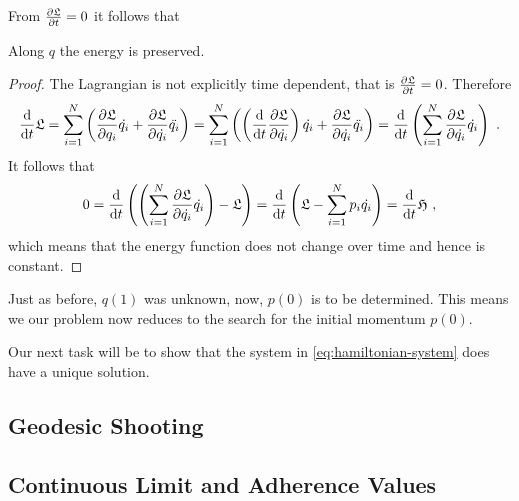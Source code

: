 From $\frac{\partial \mathfrak{L}}{\partial t} = 0$ it follows that
\begin{corollary}
	Along $q$ the energy is preserved.
\end{corollary}
\begin{proof}
	The Lagrangian is not explicitly time dependent, that is $\frac{\partial \mathfrak{L}}{\partial t} = 0$.
	Therefore
	\begin{equation}
		\frac{\mathrm{d}}{\mathrm{d} t} \mathfrak{L} = \sum_{i=1}^{N}\left(\frac{\partial \mathfrak{L}}{\partial q_i} \dot{q_i} + \frac{\partial \mathfrak{L}}{\partial \dot{q_i}} \ddot{q_i} \right )
		=\sum_{i=1}^{N}\left( \left( \frac{\mathrm{d}}{\mathrm{d} t} \frac{\partial \mathfrak{L}}{\partial \dot{q_i}} 
		\right)\dot{q_i}+ \frac{\partial \mathfrak{L}}{\partial \dot{q_i}} \ddot{q_i}\right )
		= \frac{\mathrm{d}}{\mathrm{d} t} \left(\sum_{i=1}^{N} \frac{\partial \mathfrak{L}}{\partial \dot{q_i}} \dot{q_i}\right) \ .
	\end{equation}
	It follows that
	\begin{equation}
		0 = \frac{\mathrm{d}}{\mathrm{d} t} \left( \left(\sum_{i=1}^{N} \frac{\partial \mathfrak{L}}{\partial \dot{q_i}} \dot{q_i} \right) -  \mathfrak{L} \right) 
		= \frac{\mathrm{d}}{\mathrm{d} t} \left( \mathfrak{L} - \sum_{i=1}^{N} p_i \dot{q_i}\right)
		= \frac{\mathrm{d}}{\mathrm{d} t} \mathfrak{H} \ ,
	\end{equation}
	which means that the energy function does not change over time and hence is constant.
\end{proof}

Just as before, $q(1)$ was unknown, now, $p(0)$ is to be determined.
This means we our problem now reduces to the search for the initial momentum $p(0)$.


Our next task will be to show that the system in \cref{eq:hamiltonian-system} does have a unique solution.

\subsection{Geodesic Shooting}

\subsection{Continuous Limit and Adherence Values}

